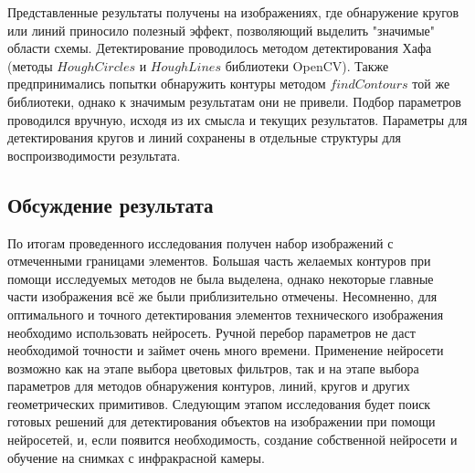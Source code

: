 








Представленные результаты получены на изображениях, где обнаружение кругов или линий приносило полезный эффект, позволяющий выделить "значимые" области схемы.
\newline
Детектирование проводилось методом детектирования Хафа (методы $HoughCircles$ и $HoughLines$ библиотеки OpenCV). Также предпринимались попытки обнаружить контуры методом $findContours$ той же библиотеки, однако к значимым результатам они не привели.
\newline
Подбор параметров проводился вручную, исходя из их смысла и текущих результатов. Параметры для детектирования кругов и линий сохранены в отдельные структуры для воспроизводимости результата.

\subsection{Обсуждение результата}
По итогам проведенного исследования получен набор изображений с отмеченными границами элементов. Большая часть желаемых контуров при помощи исследуемых методов не была выделена, однако некоторые главные части изображения всё же были приблизительно отмечены. 
\newline
Несомненно, для оптимального и точного детектирования элементов технического изображения необходимо использовать нейросеть. Ручной перебор параметров не даст необходимой точности и займет очень много времени. Применение нейросети возможно как на этапе выбора цветовых фильтров, так и на этапе выбора параметров для методов обнаружения контуров, линий, кругов и других геометрических примитивов.
\newline
Следующим этапом исследования будет поиск готовых решений для детектирования объектов на изображении при помощи нейросетей, и, если появится необходимость, создание собственной нейросети и обучение на снимках с инфракрасной камеры.